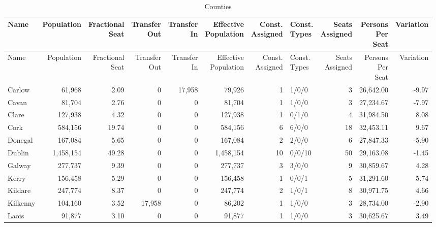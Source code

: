 \documentclass[a4paper]{article}
\begin{document}
\begin{longtable}{lrrrrrrlrrr}
\caption{Counties}
\\ \toprule
Name &Population &\shortstack{Fractional\\Seat} &\shortstack{Transfer\\Out} &\shortstack{Transfer\\In} &\shortstack{Effective\\Population} &\shortstack{Const.\\Assigned} &\shortstack{Const.\\Types} &\shortstack{Seats\\Assigned} &\shortstack{Persons\\Per\\Seat} &Variation \\ \midrule
\endfirsthead
\toprule
Name &Population &\shortstack{Fractional\\Seat} &\shortstack{Transfer\\Out} &\shortstack{Transfer\\In} &\shortstack{Effective\\Population} &\shortstack{Const.\\Assigned} &\shortstack{Const.\\Types} &\shortstack{Seats\\Assigned} &\shortstack{Persons\\Per\\Seat} &Variation \\ \midrule
\endhead
\bottomrule
\endfoot
Carlow&61,968& 2.09&0&17,958&79,926&1&1/0/0&3&26,642.00&-9.97\\ 
Cavan&81,704& 2.76&0&0&81,704&1&1/0/0&3&27,234.67&-7.97\\ 
Clare&127,938& 4.32&0&0&127,938&1&0/1/0&4&31,984.50& 8.08\\ 
Cork&584,156&19.74&0&0&584,156&6&6/0/0&18&32,453.11& 9.67\\ 
Donegal&167,084& 5.65&0&0&167,084&2&2/0/0&6&27,847.33&-5.90\\ 
Dublin&1,458,154&49.28&0&0&1,458,154&10&0/0/10&50&29,163.08&-1.45\\ 
Galway&277,737& 9.39&0&0&277,737&3&3/0/0&9&30,859.67& 4.28\\ 
Kerry&156,458& 5.29&0&0&156,458&1&0/0/1&5&31,291.60& 5.74\\ 
Kildare&247,774& 8.37&0&0&247,774&2&1/0/1&8&30,971.75& 4.66\\ 
Kilkenny&104,160& 3.52&17,958&0&86,202&1&1/0/0&3&28,734.00&-2.90\\ 
Laois&91,877& 3.10&0&0&91,877&1&1/0/0&3&30,625.67& 3.49\\ 

\end{longtable}
\end{document}

